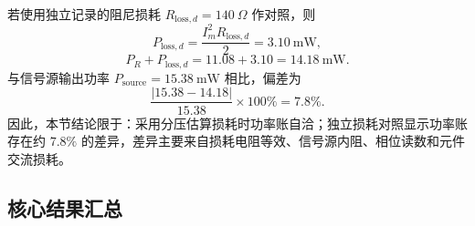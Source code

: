 ﻿\documentclass[UTF8,12pt,a4paper]{ctexart}
\numberwithin{equation}{section}
\begin{document}
若使用独立记录的阻尼损耗 \(R_{\mathrm{loss},d}=140\ \Omega\) 作对照，则
\begin{equation}
    P_{\mathrm{loss},d}
    =\frac{I_m^2R_{\mathrm{loss},d}}{2}
    =3.10\ \mathrm{mW},
\end{equation}
\begin{equation}
    P_R+P_{\mathrm{loss},d}
    =11.08+3.10
    =14.18\ \mathrm{mW}.
\end{equation}
与信号源输出功率 \(P_{\mathrm{source}}=15.38\ \mathrm{mW}\) 相比，偏差为
\begin{equation}
    \frac{|15.38-14.18|}{15.38}\times100\%
    =7.8\%.
\end{equation}
因此，本节结论限于：采用分压估算损耗时功率账自洽；独立损耗对照显示功率账存在约 \(7.8\%\) 的差异，差异主要来自损耗电阻等效、信号源内阻、相位读数和元件交流损耗。

\subsection{核心结果汇总}
\end{document}

